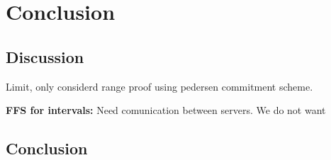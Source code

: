 \chapter{Conclusion}
\label{ch:Conslusion}
\section{Discussion}
Limit, only considerd range proof using pedersen commitment scheme.


\textbf{FFS for intervals: }Need comunication between servers. We do not want 
\section{Conclusion}
